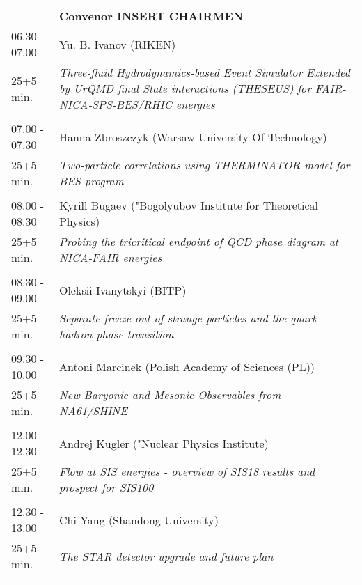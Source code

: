 \begin{longtable}{p{3cm}p{13cm}}
&\hfill {\bf Convenor INSERT CHAIRMEN }\\ 
06.30 - 07.00 & Yu. B. Ivanov (RIKEN)\\ 
25+5 min. & {\it Three-fluid Hydrodynamics-based Event Simulator Extended by UrQMD final State interactions  (THESEUS) for FAIR-NICA-SPS-BES/RHIC energies}\\ 
 & \\ 
07.00 - 07.30 & Hanna Zbroszczyk (Warsaw University Of Technology)\\ 
25+5 min. & {\it Two-particle correlations using THERMINATOR model for BES program}\\ 
 & \\ 
08.00 - 08.30 & Kyrill Bugaev ("Bogolyubov Institute for Theoretical Physics)\\ 
25+5 min. & {\it Probing the tricritical endpoint of QCD phase diagram at NICA-FAIR energies}\\ 
 & \\ 
08.30 - 09.00 & Oleksii Ivanytskyi (BITP)\\ 
25+5 min. & {\it Separate freeze-out of strange particles and the quark-hadron phase transition}\\ 
 & \\ 
09.30 - 10.00 & Antoni Marcinek (Polish Academy of Sciences (PL))\\ 
25+5 min. & {\it New Baryonic and Mesonic Observables from NA61/SHINE}\\ 
 & \\ 
12.00 - 12.30 & Andrej Kugler ("Nuclear Physics Institute)\\ 
25+5 min. & {\it Flow at SIS energies - overview of SIS18 results and prospect for SIS100}\\ 
 & \\ 
12.30 - 13.00 & Chi Yang (Shandong University)\\ 
25+5 min. & {\it The STAR detector upgrade and future plan}\\ 
 & \\ 
\end{longtable}

